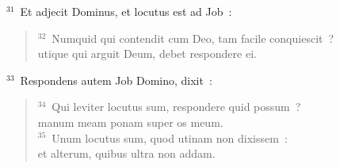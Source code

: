 ${}^{31}$~Et adjecit Dominus, et locutus est ad Job~:
\begin{flushleft}\begin{verse}${}^{32}$~Numquid qui contendit cum Deo, tam facile conquiescit~?\\ utique qui arguit Deum, debet respondere ei.\end{verse}\end{flushleft}


${}^{33}$~Respondens autem Job Domino, dixit~:
\begin{flushleft}\begin{verse}${}^{34}$~Qui leviter locutus sum, respondere quid possum~?\\ manum meam ponam super os meum.\\
${}^{35}$~Unum locutus sum, quod utinam non dixissem~:\\ et alterum, quibus ultra non addam.\end{verse}\end{flushleft}


